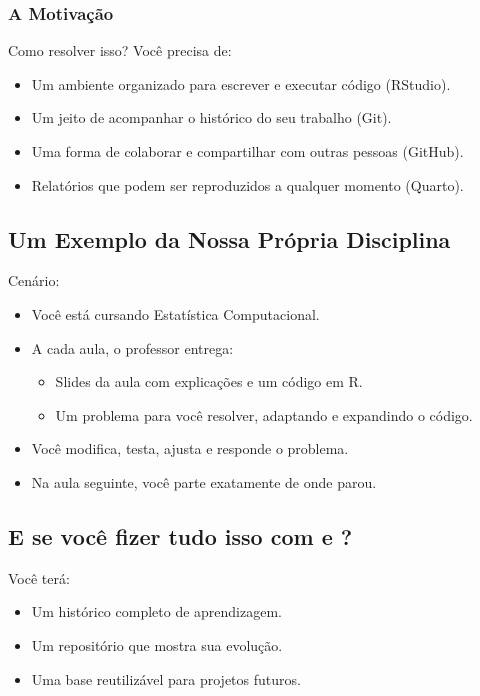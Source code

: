 \documentclass[
  letterpaper,
  DIV=11,
  numbers=noendperiod]{scrartcl}
\begin{document}
\subsubsection{A Motivação}\label{a-motivauxe7uxe3o}

Como resolver isso? Você precisa de:

\begin{itemize}
\item
  Um ambiente organizado para escrever e executar código (RStudio).
\item
  Um jeito de acompanhar o histórico do seu trabalho (Git).
\item
  Uma forma de colaborar e compartilhar com outras pessoas (GitHub).
\item
  Relatórios que podem ser reproduzidos a qualquer momento (Quarto).
\end{itemize}

\subsection{Um Exemplo da Nossa Própria
Disciplina}\label{um-exemplo-da-nossa-pruxf3pria-disciplina}

Cenário:

\begin{itemize}
\item
  Você está cursando Estatística Computacional.
\item
  A cada aula, o professor entrega:

  \begin{itemize}
  \item
    Slides da aula com explicações e um código em R.
  \item
    Um problema para você resolver, adaptando e expandindo o código.
  \end{itemize}
\item
  Você modifica, testa, ajusta e responde o problema.
\item
  Na aula seguinte, você parte exatamente de onde parou.
\end{itemize}

\subsection{\texorpdfstring{E se você fizer tudo isso com e
?}{E se você fizer tudo isso com  e ?}}\label{e-se-vocuxea-fizer-tudo-isso-com-e}

Você terá:

\begin{itemize}
\item
  Um histórico completo de aprendizagem.
\item
  Um repositório que mostra sua evolução.
\item
  Uma base reutilizável para projetos futuros.
\end{itemize}
\end{document}
